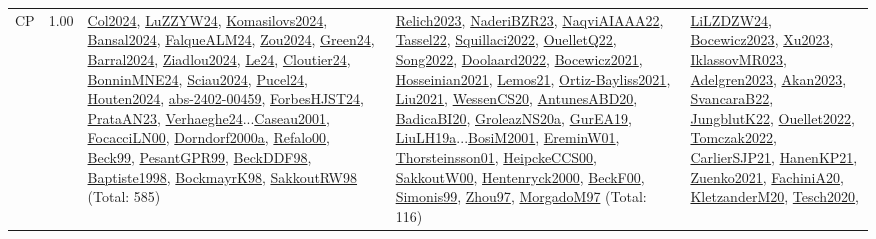 {\begin{longtable}{p{3cm}r>{\raggedright\arraybackslash}p{6cm}>{\raggedright\arraybackslash}p{6cm}>{\raggedright\arraybackslash}p{8cm}}
\index{CP}\index{CP!CP}CP &  1.00 & \hyperref[detail:Col2024]{Col2024}, \hyperref[detail:LuZZYW24]{LuZZYW24}, \hyperref[detail:Komasilovs2024]{Komasilovs2024}, \hyperref[detail:Bansal2024]{Bansal2024}, \hyperref[detail:FalqueALM24]{FalqueALM24}, \hyperref[detail:Zou2024]{Zou2024}, \hyperref[detail:Green24]{Green24}, \hyperref[detail:Barral2024]{Barral2024}, \hyperref[detail:Ziadlou2024]{Ziadlou2024}, \hyperref[detail:Le24]{Le24}, \hyperref[detail:Cloutier24]{Cloutier24}, \hyperref[detail:BonninMNE24]{BonninMNE24}, \hyperref[detail:Sciau2024]{Sciau2024}, \hyperref[detail:Pucel24]{Pucel24}, \hyperref[detail:Houten2024]{Houten2024}, \hyperref[detail:abs-2402-00459]{abs-2402-00459}, \hyperref[detail:ForbesHJST24]{ForbesHJST24}, \hyperref[detail:PrataAN23]{PrataAN23}, \hyperref[detail:Verhaeghe24]{Verhaeghe24}...\hyperref[detail:Caseau2001]{Caseau2001}, \hyperref[detail:FocacciLN00]{FocacciLN00}, \hyperref[detail:Dorndorf2000a]{Dorndorf2000a}, \hyperref[detail:Refalo00]{Refalo00}, \hyperref[detail:Beck99]{Beck99}, \hyperref[detail:PesantGPR99]{PesantGPR99}, \hyperref[detail:BeckDDF98]{BeckDDF98}, \hyperref[detail:Baptiste1998]{Baptiste1998}, \hyperref[detail:BockmayrK98]{BockmayrK98}, \hyperref[detail:SakkoutRW98]{SakkoutRW98} (Total: 585) & \hyperref[detail:Relich2023]{Relich2023}, \hyperref[detail:NaderiBZR23]{NaderiBZR23}, \hyperref[detail:NaqviAIAAA22]{NaqviAIAAA22}, \hyperref[detail:Tassel22]{Tassel22}, \hyperref[detail:Squillaci2022]{Squillaci2022}, \hyperref[detail:OuelletQ22]{OuelletQ22}, \hyperref[detail:Song2022]{Song2022}, \hyperref[detail:Doolaard2022]{Doolaard2022}, \hyperref[detail:Bocewicz2021]{Bocewicz2021}, \hyperref[detail:Hosseinian2021]{Hosseinian2021}, \hyperref[detail:Lemos21]{Lemos21}, \hyperref[detail:Ortiz-Bayliss2021]{Ortiz-Bayliss2021}, \hyperref[detail:Liu2021]{Liu2021}, \hyperref[detail:WessenCS20]{WessenCS20}, \hyperref[detail:AntunesABD20]{AntunesABD20}, \hyperref[detail:BadicaBI20]{BadicaBI20}, \hyperref[detail:GroleazNS20a]{GroleazNS20a}, \hyperref[detail:GurEA19]{GurEA19}, \hyperref[detail:LiuLH19a]{LiuLH19a}...\hyperref[detail:BosiM2001]{BosiM2001}, \hyperref[detail:EreminW01]{EreminW01}, \hyperref[detail:Thorsteinsson01]{Thorsteinsson01}, \hyperref[detail:HeipckeCCS00]{HeipckeCCS00}, \hyperref[detail:SakkoutW00]{SakkoutW00}, \hyperref[detail:Hentenryck2000]{Hentenryck2000}, \hyperref[detail:BeckF00]{BeckF00}, \hyperref[detail:Simonis99]{Simonis99}, \hyperref[detail:Zhou97]{Zhou97}, \hyperref[detail:MorgadoM97]{MorgadoM97} (Total: 116) & \hyperref[detail:LiLZDZW24]{LiLZDZW24}, \hyperref[detail:Bocewicz2023]{Bocewicz2023}, \hyperref[detail:Xu2023]{Xu2023}, \hyperref[detail:IklassovMR023]{IklassovMR023}, \hyperref[detail:Adelgren2023]{Adelgren2023}, \hyperref[detail:Akan2023]{Akan2023}, \hyperref[detail:SvancaraB22]{SvancaraB22}, \hyperref[detail:JungblutK22]{JungblutK22}, \hyperref[detail:Ouellet2022]{Ouellet2022}, \hyperref[detail:Tomczak2022]{Tomczak2022}, \hyperref[detail:CarlierSJP21]{CarlierSJP21}, \hyperref[detail:HanenKP21]{HanenKP21}, \hyperref[detail:Zuenko2021]{Zuenko2021}, \hyperref[detail:FachiniA20]{FachiniA20}, \hyperref[detail:KletzanderM20]{KletzanderM20}, \hyperref[detail:Tesch2020]{Tesch2020}, 
\end{longtable}}
